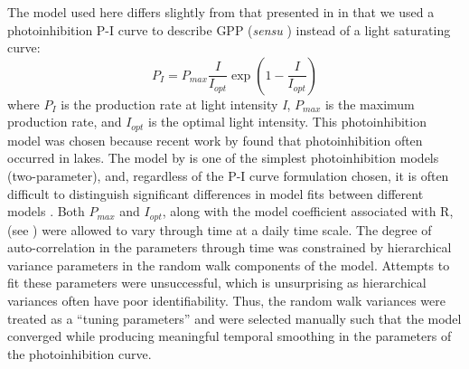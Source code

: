 \documentclass[12pt, oneside]{article}
\begin{document}
The model used here differs slightly from that presented in \citealt{phillips_timevarying_2020} in that we used a photoinhibition P-I curve \citep{steele_environmental_1962} to describe GPP (\emph{sensu} \citealt{staehr_global_2016}) instead of a light saturating curve: 
\[
P_I = P_{max} \frac{I}{I_{opt}} \exp\left(1-\frac{I}{I_{opt}} \right)
\]
where \(P_I\) is the production rate at light intensity \emph{I}, \(P_{max}\) is the maximum production rate, and \(I_{opt}\) is the optimal light intensity. This photoinhibition model was chosen because recent work by \citet{staehr_global_2016} found that photoinhibition often occurred in lakes. The model by \citet{steele_environmental_1962} is one of the simplest photoinhibition models (two-parameter), and, regardless of the P-I curve formulation chosen, it is often difficult to distinguish significant differences in model fits between different models \citep{Aalderink_Jovin_1997}. Both \(P_{max}\) and \(I_{opt}\), along with the model coefficient associated with R, (see \citealt{phillips_timevarying_2020}) were allowed to vary through time at a daily time scale. The degree of auto-correlation in the parameters through time was constrained by hierarchical variance parameters in the random walk components of the model. Attempts to fit these parameters were unsuccessful, which is unsurprising as hierarchical variances often have poor identifiability. Thus, the random walk variances were treated as a ``tuning parameters'' and were selected manually such that the model converged while producing meaningful temporal smoothing in the parameters of the photoinhibition curve.
\end{document}
